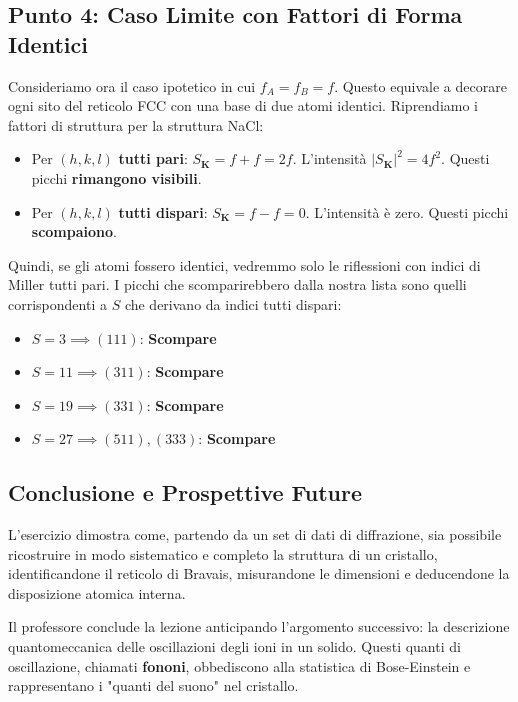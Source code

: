 \subsection{Punto 4: Caso Limite con Fattori di Forma Identici}
Consideriamo ora il caso ipotetico in cui $f_A = f_B = f$. Questo equivale a decorare ogni sito del reticolo FCC con una base di due atomi identici.
Riprendiamo i fattori di struttura per la struttura NaCl:
\begin{itemize}
    \item Per $(h,k,l)$ \textbf{tutti pari}: $S_\mathbf{K} = f + f = 2f$. L'intensità $|S_\mathbf{K}|^2 = 4f^2$. Questi picchi \textbf{rimangono visibili}.
    \item Per $(h,k,l)$ \textbf{tutti dispari}: $S_\mathbf{K} = f - f = 0$. L'intensità è zero. Questi picchi \textbf{scompaiono}.
\end{itemize}
Quindi, se gli atomi fossero identici, vedremmo solo le riflessioni con indici di Miller tutti pari.
I picchi che scomparirebbero dalla nostra lista sono quelli corrispondenti a $S$ che derivano da indici tutti dispari:
\begin{itemize}
    \item $S=3 \implies (111)$: \textbf{Scompare}
    \item $S=11 \implies (311)$: \textbf{Scompare}
    \item $S=19 \implies (331)$: \textbf{Scompare}
    \item $S=27 \implies (511), (333)$: \textbf{Scompare}
\end{itemize}

\subsection{Conclusione e Prospettive Future}
L'esercizio dimostra come, partendo da un set di dati di diffrazione, sia possibile ricostruire in modo sistematico e completo la struttura di un cristallo, identificandone il reticolo di Bravais, misurandone le dimensioni e deducendone la disposizione atomica interna.

Il professore conclude la lezione anticipando l'argomento successivo: la descrizione quantomeccanica delle oscillazioni degli ioni in un solido. Questi quanti di oscillazione, chiamati \textbf{fononi}, obbediscono alla statistica di Bose-Einstein e rappresentano i "quanti del suono" nel cristallo.
